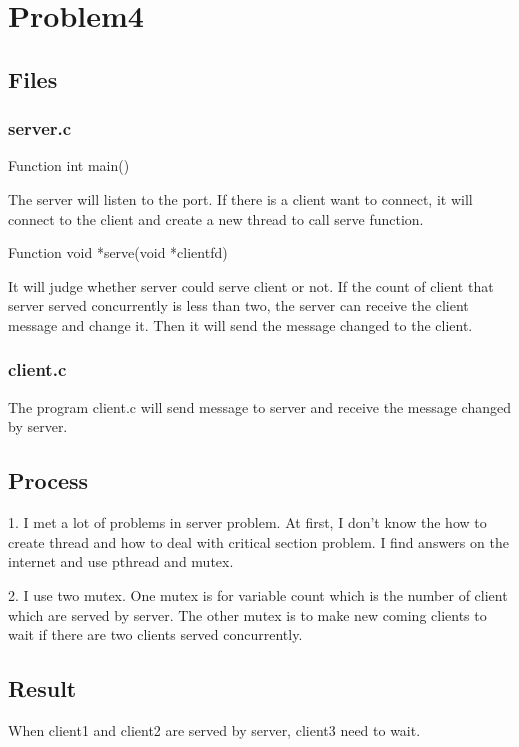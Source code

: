 \documentclass[a4paper,oneside,12pt]{article}
\begin{document}
\section{Problem4}
\subsection{Files}
\subsubsection{server.c}

Function int main()

The server will listen to the port. If there is a client want to connect, it will connect to the client and create a new thread to call serve function.

Function void *serve(void *clientfd)

It will judge whether server could serve client or not. If the count of client that server served concurrently is less than two, the server can receive the client message and change it. Then it will send the message changed to the client.

\subsubsection{client.c}

The program client.c will send message to server and receive the message changed by server.

\subsection{Process}

1. I met a lot of problems in server problem. At first, I don't know the how to create thread and how to deal with critical section problem. I find answers on the internet and use pthread and mutex.

2. I use two mutex. One mutex is for variable count which is the number of client which are served by server. The other mutex is to make new coming clients to wait if there are two clients served concurrently.

\subsection{Result}

When client1 and client2 are served by server, client3 need to wait.
\end{document}
